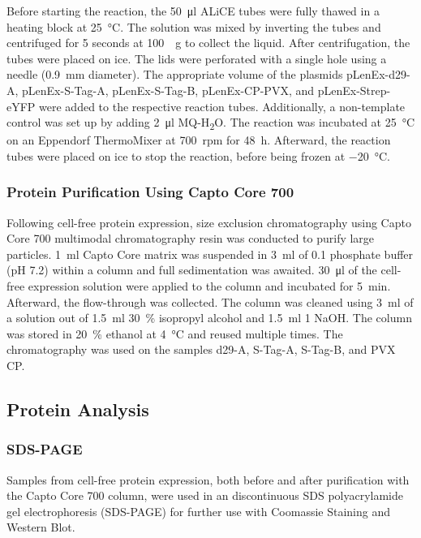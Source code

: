 Before starting the reaction, the \SI{50}{\micro\litre} ALiCE tubes were fully thawed in a heating block at \SI{25}{\degreeCelsius}. The solution was mixed by inverting the tubes and centrifuged for 5 seconds at \SI{100}{\times g} to collect the liquid. After centrifugation, the tubes were placed on ice. The lids were perforated with a single hole using a needle (\SI{0.9}{\milli\meter} diameter). The appropriate volume of the plasmids pLenEx-d29-A, pLenEx-S-Tag-A, pLenEx-S-Tag-B, pLenEx-CP-PVX, and pLenEx-Strep-eYFP were added to the respective reaction tubes. Additionally, a non-template control was set up by adding \SI{2}{\micro\litre} MQ-H\textsubscript{2}O. The reaction was incubated at \SI{25}{\degreeCelsius} on an Eppendorf ThermoMixer at \SI{700}{rpm} for \SI{48}{\hour}. Afterward, the reaction tubes were placed on ice to stop the reaction, before being frozen at \SI{-20}{\degreeCelsius}. 

\subsubsection{Protein Purification Using Capto Core 700}
Following cell-free protein expression, size exclusion chromatography using Capto\textsuperscript{\texttrademark} Core 700 multimodal chromatography resin was conducted to purify large particles. \SI{1}{\milli\litre} Capto\textsuperscript{\texttrademark} Core matrix was suspended in \SI{3}{\milli\litre} of \SI{0.1}{\Molar} phosphate buffer (pH 7.2) within a column and full sedimentation was awaited. \SI{30}{\micro\litre} of the cell-free expression solution were applied to the column and incubated for \SI{5}{\minute}. Afterward, the flow-through was collected. The column was cleaned using \SI{3}{\milli\litre} of a solution out of \SI{1.5}{\milli\litre} \SI{30}{\percent} isopropyl alcohol and \SI{1.5}{\milli\litre} \SI{1}{\Molar} NaOH. The column was stored in \SI{20}{\percent} ethanol at \SI{4}{\degreeCelsius} and reused multiple times. The chromatography was used on the samples d29-A, S-Tag-A, S-Tag-B, and PVX CP. 

\subsection{Protein Analysis}
\subsubsection{SDS-PAGE}
Samples from cell-free protein expression, both before and after purification with the Capto\textsuperscript{\texttrademark} Core 700 column, were used in an discontinuous SDS polyacrylamide gel electrophoresis (SDS-PAGE) for further use with Coomassie Staining and Western Blot. 

